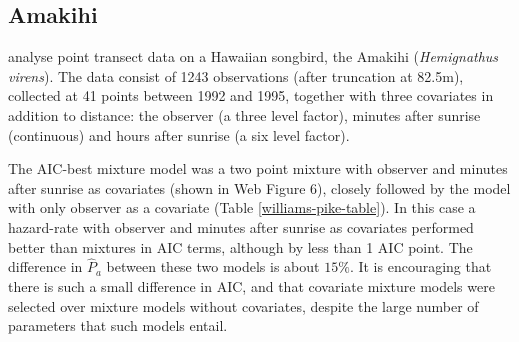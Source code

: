 \documentclass[useAMS,referee,usenatbib]{biom}
\begin{document}
\subsection{Amakihi}
\label{s:amakihi}

\cite{Marques:2007vm} analyse point transect data on a Hawaiian songbird, the Amakihi (\textit{Hemignathus virens}). The data consist of 1243 observations (after truncation at 82.5m), collected at 41 points between 1992 and 1995, together with three covariates in addition to distance: the observer (a three level factor), minutes after sunrise (continuous) and hours after sunrise (a six level factor).

The AIC-best mixture model was a two point mixture with observer and minutes after sunrise as covariates (shown in Web Figure 6), closely followed by the model with only observer as a covariate (Table \ref{williams-pike-table}). In this case a hazard-rate with observer and minutes after sunrise as covariates performed better than mixtures in AIC terms, although by less than 1 AIC point. The difference in $\hat{P}_a$ between these two models is about $15\%$.  It is encouraging that there is such a small difference in AIC, and that covariate mixture models were selected over mixture models without covariates, despite the large number of parameters that such models entail.
\end{document}
